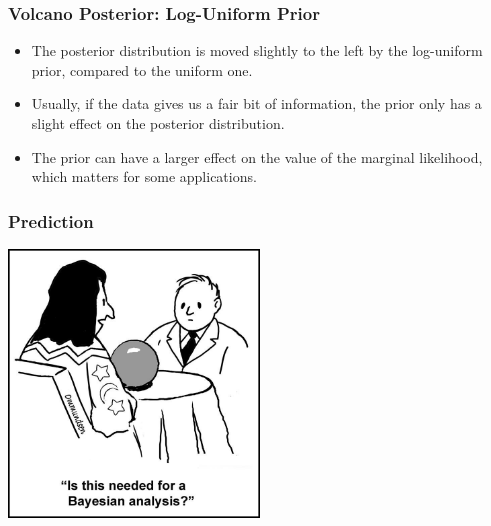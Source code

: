 \documentclass{beamer}
\begin{document}
\begin{frame}[fragile]
\frametitle{Volcano Posterior: Log-Uniform Prior}

\begin{itemize}
\item The posterior distribution is moved slightly to the left by the log-uniform prior, compared to the uniform one.\pause
\item Usually, if the data gives us a fair bit of information, the prior
only has a slight effect on the posterior distribution.\pause
\item The prior can have a larger effect on the value of the
marginal likelihood, which
matters for some applications.
\end{itemize}

\end{frame}



\begin{frame}[fragile]
\frametitle{Prediction}

\begin{center}
\includegraphics[width=0.5\textwidth]{images/crystal_ball.jpg}
\end{center}
\end{frame}
\end{document}
